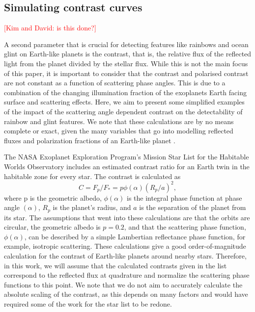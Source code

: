 \documentclass[
    usenatbib,
]{mnras}
\newcommand{\todo}[1]{\textcolor{red}{[#1]}}
\begin{document}
\subsection{Simulating contrast curves}
\todo{Kim and David: is this done?}

A second parameter that is crucial for detecting features like rainbows and ocean glint on Earth-like planets is the contrast, that is, the relative flux of the reflected light from the planet divided by the stellar flux. 
%
While this is not the main focus of this paper, it is important to consider that the contrast and polarised contrast are not constant as a function of scattering phase angles.
%
This is due to a combination of the changing illumination fraction of the exoplanets Earth facing surface and scattering effects.
%
Here, we aim to present some simplified examples of the impact of the scattering angle dependent contrast on the detectability of rainbow and glint features. 
%
We note that these calculations are by no means complete or exact, given the many variables that go into modelling reflected fluxes and polarization fractions of an Earth-like planet \citep{ treesandstam2019,trees2022}.


The NASA Exoplanet Exploration Program’s Mission Star List for the Habitable Worlds Observatory includes an estimated contrast ratio for an Earth twin in the habitable zone for every star. 
%
The contrast is calculated as 
\begin{equation}
C = F_p/F_* = p \phi (\alpha) (R_p/a)^2,
\end{equation}
where p is the geometric albedo, $\phi (\alpha)$ is the integral phase function at phase angle $(\alpha)$, $R_p$ is the planet’s radius, and $a$ is the separation of the planet from its star. 
%
The assumptions that went into these calculations are that the orbits are circular, the geometric albedo is $p=0.2$, and that the scattering phase function, $\phi(\alpha)$, can be described by a simple Lambertian reflectance phase function, for example, isotropic scattering.
%
These calculations give a good order-of-magnitude calculation for the contrast of Earth-like planets around nearby stars.
%
Therefore, in this work, we will assume that the calculated contrasts given in the list correspond to the reflected flux at quadrature and normalize the scattering phase functions to this point.
%
We note that we do not aim to accurately calculate the absolute scaling of the contrast, as this depends on many factors and would have required some of the work for the star list to be redone.
\end{document}
